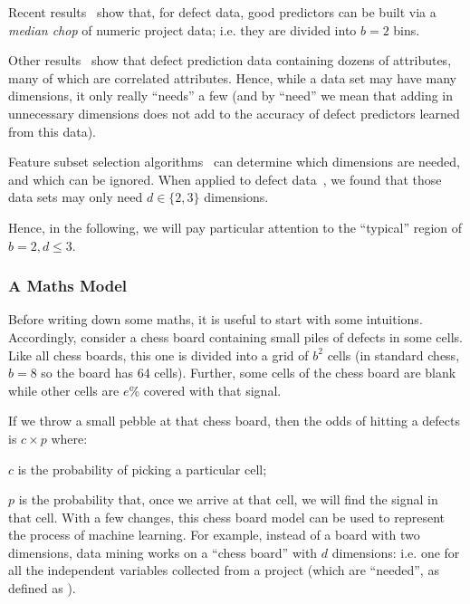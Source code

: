 Recent
results~\cite{Zhang2014,nam2015clami} show that, for defect data, good
predictors can be built via a {\em median chop} of
numeric project data;
i.e. they are divided into $b=2$ bins.

Other results~\cite{shepperd94}
show that defect prediction data containing dozens
of attributes, many of which are correlated
attributes. Hence, while a data set may have many dimensions, it only really ``needs'' a few
(and by ``need'' we mean that adding in unnecessary dimensions does not add to the accuracy
of defect predictors learned from this data).


Feature subset selection algorithms~\cite{Hall03} can  determine
which  dimensions are needed, and which can be ignored.
When applied to defect data~\cite{Menzies07},
we found that those data sets may only need  $d \in \{2,3\}$
dimensions.

Hence, in the following, we will pay particular attention to the ``typical'' region of
 $b=2, d \le 3$.

\subsubsection{A Maths Model}

Before writing down some maths, it is useful to start with some intuitions.
Accordingly, consider a chess board  containing small  piles of defects in some cells.
Like all chess boards, this one is  divided into a grid of $b^2$ cells (in standard chess, $b=8$ so the board has 64 cells).
Further, some cells of the chess board are blank while other cells are $e$\% covered
with that signal.

If we throw a small pebble at that chess board, then  the odds
of hitting a defects is $c \times p$ where:
\bi
\item $c$ is the probability of picking a particular cell;
\item $p$ is the probability that, once we arrive at that cell, we will find  the  signal in that cell.
\ei
With a few changes, this chess board model can be
used to represent the process of machine
learning. For example,
instead of a board with two
dimensions, data mining works on a ``chess board''
with $d$ dimensions: i.e. one for all the independent
variables collected from a project (which are ``needed'', as defined as ).

